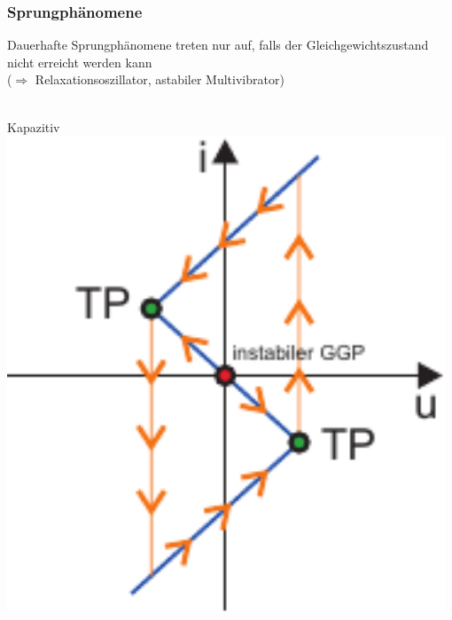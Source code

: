 \documentclass[a4paper,twocolumn,10pt]{article}
\begin{document}
\subsubsection*{Sprungphänomene}
Dauerhafte Sprungphänomene treten nur auf, falls der Gleichgewichtszustand nicht erreicht werden kann\\
($\Rightarrow$ Relaxationsoszillator, astabiler Multivibrator)\\\\
\begin{minipage}[t]{0.23\textwidth}
Kapazitiv\\
\includegraphics[width=0.98\textwidth]{img/PfadSprung1}\\\\
\end{minipage}
\hfill
\end{document}
